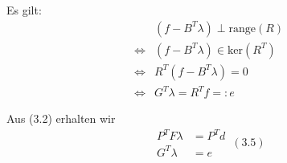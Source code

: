 Es gilt:
\begin{align*}
  & (f-B^T\lambda)\perp \text{range}(R) \\
  \Leftrightarrow & (f-B^T\lambda) \in \text{ker} (R^T) \\
  \Leftrightarrow & R^T(f-B^T\lambda)=0 \\
  \Leftrightarrow & G^T\lambda = R^Tf =:e
\end{align*}

Aus (3.2) erhalten wir
\[ 
  \boxed{
    \begin{aligned}
      P^TF\lambda &= P^Td \\
      G^T\lambda &= e  
    \end{aligned}
  } \, (3.5) 
\]


